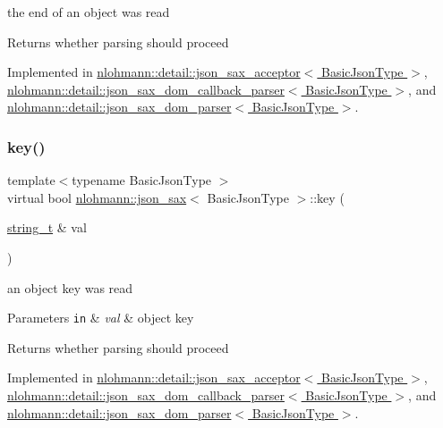 the end of an object was read 

\begin{DoxyReturn}{Returns}
whether parsing should proceed 
\end{DoxyReturn}


Implemented in \hyperlink{classnlohmann_1_1detail_1_1json__sax__acceptor_aec85a55e7febe5edef2235a55ce7b0bc}{nlohmann\+::detail\+::json\+\_\+sax\+\_\+acceptor$<$ Basic\+Json\+Type $>$}, \hyperlink{classnlohmann_1_1detail_1_1json__sax__dom__callback__parser_af45184ab12f7b9afd7cf5d8616731395}{nlohmann\+::detail\+::json\+\_\+sax\+\_\+dom\+\_\+callback\+\_\+parser$<$ Basic\+Json\+Type $>$}, and \hyperlink{classnlohmann_1_1detail_1_1json__sax__dom__parser_a0ed3d660d7d97411fdebeba233b4d994}{nlohmann\+::detail\+::json\+\_\+sax\+\_\+dom\+\_\+parser$<$ Basic\+Json\+Type $>$}.

\mbox{\label{structnlohmann_1_1json__sax_a2e0c7ecd80b18d18a8cc76f71cfc2028}} 
\subsubsection{\texorpdfstring{key()}{key()}}
{\footnotesize\ttfamily template$<$typename Basic\+Json\+Type $>$ \\
virtual bool \hyperlink{structnlohmann_1_1json__sax}{nlohmann\+::json\+\_\+sax}$<$ Basic\+Json\+Type $>$\+::key (\begin{DoxyParamCaption}\item[{\hyperlink{structnlohmann_1_1json__sax_ae01977a9f3c5b3667b7a2929ed91061e}{string\+\_\+t} \&}]{val }\end{DoxyParamCaption})\hspace{0.3cm}{\ttfamily [pure virtual]}}



an object key was read 


\begin{DoxyParams}[1]{Parameters}
\mbox{\tt in}  & {\em val} & object key \\
\hline
\end{DoxyParams}
\begin{DoxyReturn}{Returns}
whether parsing should proceed 
\end{DoxyReturn}


Implemented in \hyperlink{classnlohmann_1_1detail_1_1json__sax__acceptor_aba0060ee0b3156682d93bbd4be96a0cc}{nlohmann\+::detail\+::json\+\_\+sax\+\_\+acceptor$<$ Basic\+Json\+Type $>$}, \hyperlink{classnlohmann_1_1detail_1_1json__sax__dom__callback__parser_a5d268b49412ac97ab798d488c8e2cb12}{nlohmann\+::detail\+::json\+\_\+sax\+\_\+dom\+\_\+callback\+\_\+parser$<$ Basic\+Json\+Type $>$}, and \hyperlink{classnlohmann_1_1detail_1_1json__sax__dom__parser_a76014cffa8ce9c4bb4b25a538c5a3920}{nlohmann\+::detail\+::json\+\_\+sax\+\_\+dom\+\_\+parser$<$ Basic\+Json\+Type $>$}.

